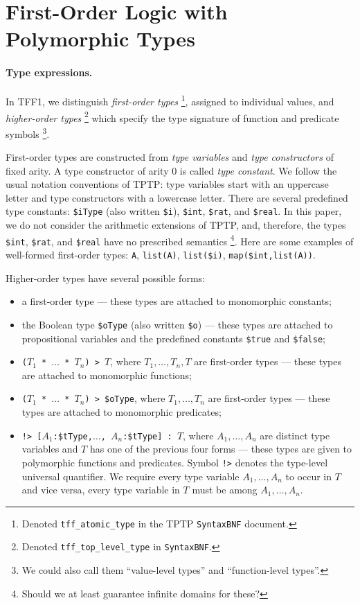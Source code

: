 \section{First-Order Logic with Polymorphic Types} \label{sec_logic}

\paragraph{Type expressions.} In TFF1, we distinguish
{\em first-order types}%
\footnote{Denoted {\tt tff\_atomic\_type} in the
TPTP {\tt SyntaxBNF} document.}, assigned to individual values,
and {\em higher-order types}%
\footnote{Denoted {\tt tff\_top\_level\_type} in {\tt SyntaxBNF}.}
which specify the type signature of function and predicate symbols%
\footnote{We could also call them ``value-level types'' and
``function-level types''.}.

First-order types are constructed from {\em type variables\/}
and {\em type constructors\/} of fixed arity. A type constructor
of arity 0 is called {\em type constant}. We follow the usual
notation conventions of TPTP: type variables start with an
uppercase letter and type constructors with a lowercase letter.
There are several predefined type constants:
\verb+$iType+ (also written \verb+$i+),
\verb+$int+, \verb+$rat+, and \verb+$real+. In this paper,
we do not consider the arithmetic extensions of TPTP, and,
therefore, the types \verb+$int+, \verb+$rat+, and \verb+$real+
have no prescribed semantics%
\footnote{Should we at least guarantee infinite domains for these?}.
Here are some examples of well-formed first-order types:
\verb+A+, \verb+list(A)+, \verb+list($i)+, \verb+map($int,list(A))+.

Higher-order types have several possible forms:
\begin{itemize}
\item a first-order type --- these types are attached to
monomorphic constants;
\item the Boolean type \verb+$oType+ (also written \verb+$o+)
--- these types are attached to propositional variables and
the predefined constants \verb+$true+ and \verb+$false+;
\item {\tt ($T_1$ * $\dots$ * $T_n$) > $T$},
where $T_1,\dots,T_n,T$ are first-order types ---
these types are attached to monomorphic functions;
\item {\tt ($T_1$ * $\dots$ * $T_n$) > \$oType},
where $T_1,\dots,T_n$ are first-order types --- these types
are attached to monomorphic predicates;
\item {\tt !>~[$A_1$:\$tType,$\dots$,%
$A_n$:\$tType]~:~$T$}, where $A_1,\dots,A_n$ are distinct
type variables and $T$ has one of the previous four forms ---
these types are given to polymorphic functions and predicates.
Symbol {\tt !>} denotes the type-level universal quantifier.
We require every type variable $A_1,\dots,A_n$ to occur
in $T$ and vice versa, every type variable in $T$ must be
among $A_1,\dots,A_n$.
\end{itemize}

